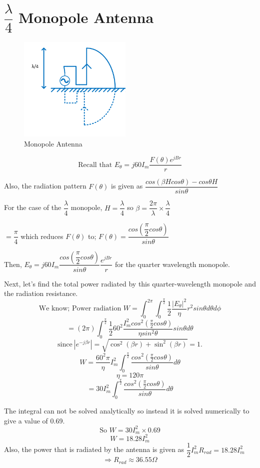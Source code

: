 \section{$\dfrac{\lambda}{4}$ Monopole Antenna}
\begin{figure}[h]
\centering
\includegraphics[height=5cm]{./graphics/image53_7}
\caption{Monopole Antenna}
\label{fig:fig7}
\end{figure}
\begin{equation*}
\text{Recall that }E_\theta = j60I_m \frac{F(\theta)e^{jBr}}{r}
\end{equation*}
\begin{center}
Also, the radiation pattern $F(\theta)$ is given as $\dfrac{cos(\beta H cos\theta) - cos\theta H}{sin \theta}$

For the case of the $\dfrac{\lambda}{4}$ monopole, $H = \dfrac{\lambda}{4}$ so $\beta = \dfrac{2\pi}{\lambda} \times \dfrac{\lambda}{4}$

$ = \dfrac{\pi}{4} $ which reduces $F(\theta)$ to; $F(\theta) = \dfrac{cos (\dfrac{\pi}{2} cos\theta)}{sin\theta}$

Then, $E_\theta = j60I_m \dfrac{cos (\dfrac{\pi}{2} cos\theta)}{sin\theta} \dfrac{e^{jBr}}{r}$ for the quarter wavelength monopole.
\end{center}
Next, let's find the total power radiated by this quarter-wavelength monopole and the radiation resistance. 
\[ \text{We know; Power radiation } W = \int_0^{2\pi}\int_{0}^{\frac{\pi}{2}} \frac{1}{2}\frac{|E_\theta|^2}{\eta}r^2sin\theta d\theta d\phi \]
\[ = (2\pi)\int_{0}^{\frac{\pi}{2}} \frac{1}{2} 60^2 \frac{I_m^2cos^2(\frac{\pi}{2}cos\theta)}{\eta sin^2\theta}sin\theta d\theta \]
$$\text{since}\ |e^{-j\beta r}| = \sqrt{\cos^2(\beta r) + \sin^2(\beta r)} = 1.$$
\[ W = \frac{60^2\pi}{\eta} I_m^2 \int_{0}^{\frac{\pi}{2}} \frac{cos^2(\frac{\pi}{2}cos\theta)}{sin\theta}d\theta \]
\[ \eta = 120\pi \]
\[ = 30I_m^2 \int_{0}^{\frac{\pi}{2}}\dfrac{cos^2(\frac{\pi}{2}cos\theta)}{sin\theta}d\theta \]

The integral can not be solved analytically so instead it is solved numerically to give a value of 0.69.
\[ \text{So } W = 30I_m^2 \times 0.69 \]
\begin{equation}
W = 18.28I_m^2
\end{equation}
Also, the power that is radiated by the antenna is given as $\dfrac{1}{2}I_m^2 R_{rad} = 18.28I_m^2$
\[ \Rightarrow R_{rad} \approx 36.55\Omega \]

